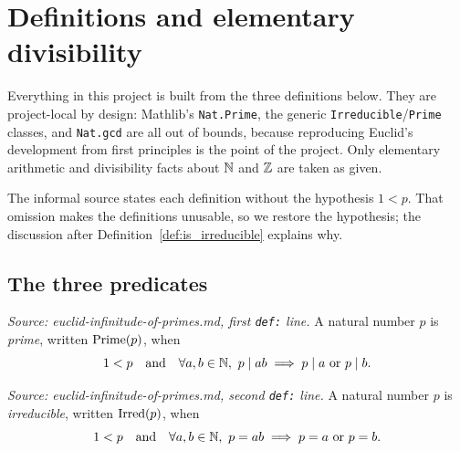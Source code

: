 \chapter{Definitions and elementary divisibility}
\label{ch:basic}

Everything in this project is built from the three definitions below. They are
project-local by design: Mathlib's \texttt{Nat.Prime}, the generic
\texttt{Irreducible}/\texttt{Prime} classes, and \texttt{Nat.gcd} are all out of
bounds, because reproducing Euclid's development from first principles is the
point of the project. Only elementary arithmetic and divisibility facts about
$\mathbb{N}$ and $\mathbb{Z}$ are taken as given.

The informal source states each definition without the hypothesis $1 < p$. That
omission makes the definitions unusable, so we restore the hypothesis; the
discussion after Definition~\ref{def:is_irreducible} explains why.

\section{The three predicates}

\begin{definition}[prime]
  \leanok
  \label{def:is_prime}
  \textit{Source: euclid-infinitude-of-primes.md, first \texttt{def:} line.}
  A natural number $p$ is \emph{prime}, written $\mathrm{Prime}(p)$, when
  \[
    1 < p \quad\text{and}\quad \forall a, b \in \mathbb{N},\ p \mid a b \implies p \mid a \ \text{or}\ p \mid b .
  \]
\end{definition}

\begin{definition}[irreducible]
  \leanok
  \label{def:is_irreducible}
  \textit{Source: euclid-infinitude-of-primes.md, second \texttt{def:} line.}
  A natural number $p$ is \emph{irreducible}, written $\mathrm{Irred}(p)$, when
  \[
    1 < p \quad\text{and}\quad \forall a, b \in \mathbb{N},\ p = a b \implies p = a \ \text{or}\ p = b .
  \]
\end{definition}

